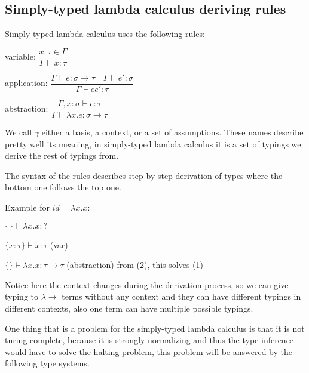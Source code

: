 
\subsection{Simply-typed lambda calculus deriving rules}

Simply-typed lambda calculus uses the following rules:


variable:
$\dfrac{x : \tau \in \Gamma}{\Gamma \vdash x : \tau}$

application:
$\dfrac{\Gamma \vdash e : \sigma \rightarrow \tau \quad \Gamma \vdash e' : \sigma}{\Gamma \vdash e e' : \tau}$

abstraction:
$\dfrac{\Gamma, x : \sigma \vdash e : \tau}{\Gamma \vdash \lambda x . e : \sigma \rightarrow \tau}$

We call $\gamma$ either a basis, a context, or a set of assumptions. These names describe pretty well its meaning, in simply-typed lambda calculus it
is a set of typings we derive the rest of typings from.

The syntax of the rules describes step-by-step derivation of types where the bottom one follows the top one.

Example for $id = \lambda x . x$:

\begin{listing}
    \item $\{\} \vdash \lambda x . x : ?$
    \item $\{x : \tau\} \vdash x : \tau$ (var)
    \item $\{\} \vdash \lambda x . x : \tau \rightarrow \tau$ (abstraction) from (2), this solves (1)
\end{listing}

Notice here the context changes during the derivation process, so we can give typing to $\lambda\rightarrow$ terms without any context
and they can have different typings in different contexts, also one term can have multiple possible typings.


One thing that is a problem for the simply-typed lambda calculus is that it is not turing complete, %
because it is strongly normalizing and thus the type inference would have to solve the halting problem,
this problem will be answered by the following type systems.

